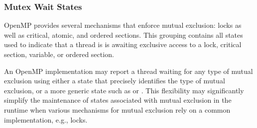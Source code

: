 \subsubsection{Mutex Wait States}

OpenMP provides several mechanisms that enforce mutual exclusion:
locks as well as critical, atomic, and ordered sections.  This
grouping contains all states used to indicate that a thread is is
awaiting exclusive access to a lock, critical section, variable,
or ordered section.

An OpenMP implementation may report a thread waiting for any type
of mutual exclusion using either a state that precisely identifies
the type of mutual exclusion, or  a more generic state such as
 or .  This
flexibility may significantly simplify the maintenance of states
associated with mutual exclusion in the runtime when various
mechanisms for mutual exclusion rely on a common implementation,
e.g., locks.


